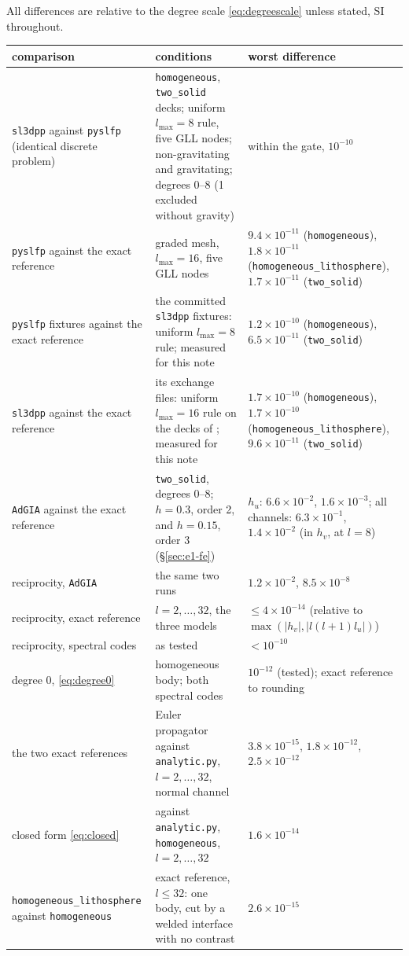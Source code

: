 \documentclass[11pt]{article}
\numberwithin{equation}{section}
\newcommand{\code}[1]{\texttt{#1}}
\begin{document}
All differences are relative to the degree scale \eqref{eq:degreescale}
unless stated, SI throughout.
\begin{center}
\small
\begin{tabular}{@{}P{4.2cm}P{6.1cm}P{4.9cm}@{}}
\toprule
comparison & conditions & worst difference \\
\midrule
\code{sl3dpp} against \code{pyslfp} (identical discrete problem) &
\code{homogeneous}, \code{two\_solid} decks; uniform $l_{\max}=8$ rule,
five GLL nodes; non-gravitating and gravitating; degrees 0--8 (1 excluded
without gravity) & within the gate, $10^{-10}$ \\ \addlinespace
\code{pyslfp} against the exact reference & graded mesh, $l_{\max}=16$,
five GLL nodes & $9.4\times10^{-11}$ (\code{homogeneous}),
$1.8\times10^{-11}$ (\code{homogeneous\_lithosphere}), $1.7\times10^{-11}$
(\code{two\_solid}) \\ \addlinespace
\code{pyslfp} fixtures against the exact reference & the committed
\code{sl3dpp} fixtures: uniform $l_{\max}=8$ rule; measured for this note &
$1.2\times10^{-10}$ (\code{homogeneous}), $6.5\times10^{-11}$
(\code{two\_solid}) \\ \addlinespace
\code{sl3dpp} against the exact reference & its exchange files: uniform
$l_{\max}=16$ rule on the decks of ; measured for
this note & $1.7\times10^{-10}$ (\code{homogeneous}), $1.7\times10^{-10}$
(\code{homogeneous\_lithosphere}), $9.6\times10^{-11}$ (\code{two\_solid}) \\ \addlinespace
\code{AdGIA} against the exact reference & \code{two\_solid}, degrees
0--8; $h=0.3$, order 2, and $h=0.15$, order 3 (\S\ref{sec:e1-fe}) & $h_u$:
$6.6\times10^{-2}$, $1.6\times10^{-3}$; all channels:
$6.3\times10^{-1}$, $1.4\times10^{-2}$ (in $h_v$, at $l=8$) \\ \addlinespace
reciprocity, \code{AdGIA} & the same two runs & $1.2\times10^{-2}$,
$8.5\times10^{-8}$ \\ \addlinespace
reciprocity, exact reference & $l=2,\dots,32$, the three models &
$\le4\times10^{-14}$ (relative to $\max(|h_v|,|l(l+1)l_u|)$) \\ \addlinespace
reciprocity, spectral codes & as tested & $<10^{-10}$ \\ \addlinespace
degree 0, \eqref{eq:degree0} & homogeneous body; both spectral codes &
$10^{-12}$ (tested); exact reference to rounding \\ \addlinespace
the two exact references & Euler propagator against \code{analytic.py},
$l=2,\dots,32$, normal channel & $3.8\times10^{-15}$, $1.8\times10^{-12}$,
$2.5\times10^{-12}$ \\ \addlinespace
closed form \eqref{eq:closed} & against \code{analytic.py},
\code{homogeneous}, $l=2,\dots,32$ & $1.6\times10^{-14}$ \\ \addlinespace
\code{homogeneous\_lithosphere} against \code{homogeneous} & exact
reference, $l\le32$: one body, cut by a welded interface with no contrast &
$2.6\times10^{-15}$ \\
\bottomrule
\end{tabular}
\end{center}
\end{document}
